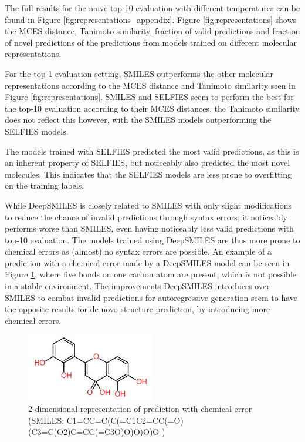 The full results for the naive top-10 evaluation with different temperatures can be found in Figure \ref{fig:representations_appendix}.
Figure \ref{fig:representations} shows the MCES distance, Tanimoto similarity, fraction of valid predictions and fraction of novel predictions of the predictions from models trained on different molecular representations.

For the top-1 evaluation setting, SMILES outperforms the other molecular representations according to the MCES distance and Tanimoto similarity seen in Figure \ref{fig:representations}.
SMILES and SELFIES seem to perform the best for the top-10 evaluation according to their MCES distances, the Tanimoto similarity does not reflect this however, with the SMILES models outperforming the SELFIES models.

The models trained with SELFIES predicted the most valid predictions, as this is an inherent property of SELFIES, but noticeably also predicted the most novel molecules.
This indicates that the SELFIES models are less prone to overfitting on the training labels.

While DeepSMILES is closely related to SMILES with only slight modifications to reduce the chance of invalid predictions through syntax errors, it noticeably performs worse than SMILES, even having noticeably less valid predictions with top-10 evaluation.
The models trained using DeepSMILES are thus more prone to chemical errors as (almost) no syntax errors are possible.
An example of a prediction with a chemical error made by a DeepSMILES model can be seen in Figure \ref{fig:invalid_pred}, where five bonds on one carbon atom are present, which is not possible in a stable environment.
The improvements DeepSMILES introduces over SMILES to combat invalid predictions for autoregressive generation seem to have the opposite results for de novo structure prediction, by introducing more chemical errors.
\begin{figure}[h]
    \centering
    \includegraphics[width=0.5\textwidth]{figures/results/invalid_pred.JPG}
    \caption{2-dimensional representation of prediction with chemical error (SMILES: C1=CC=C(C(=C1C2=CC(=O)(C3=C(O2)C=CC(=C3O)O)O)O)O )}
    \label{fig:invalid_pred}
\end{figure}

